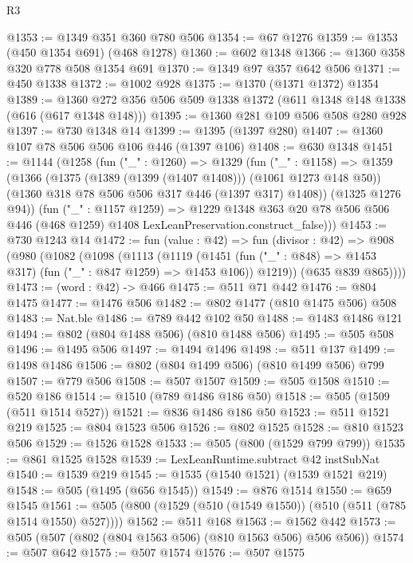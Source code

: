 \begin{lexlean}{R3}
\begin{coremodule}
@1353 := @1349 @351 @360 @780 @506
@1354 := @67 @1276
@1359 := @1353 (@450 @1354 @691) (@468 @1278)
@1360 := @602 @1348
@1366 := @1360 @358 @320 @778 @508 @1354 @691
@1370 := @1349 @97 @357 @642 @506
@1371 := @450 @1338
@1372 := @1002 @928
@1375 := @1370 (@1371 @1372) @1354
@1389 := @1360 @272 @356 @506 @509 @1338 @1372 (@611 @1348 @148 @1338 (@616 (@617 @1348 @148)))
@1395 := @1360 @281 @109 @506 @508 @280 @928
@1397 := @730 @1348 @14
@1399 := @1395 (@1397 @280)
@1407 := @1360 @107 @78 @506 @506 @106 @446 (@1397 @106)
@1408 := @630 @1348
@1451 := @1144
    (@1258
      (fun ("_" : @1260) =>
      @1329
        (fun ("_" : @1158) =>
        @1359
          (@1366
            (@1375 (@1389 (@1399 (@1407 @1408))) (@1061 @1273 @148 @50))
            (@1360 @318 @78 @506 @506 @317 @446 (@1397 @317) @1408))
          (@1325 @1276 @94))
        (fun ("_" : @1157 @1259) =>
        @1229
          @1348
          @363
          @20
          @78
          @506
          @506
          @446
          (@468 @1259)
          @1408
          LexLeanPreservation.construct_false)))
@1453 := @730 @1243 @14
@1472 := fun (value : @42) =>
  fun (divisor : @42) =>
  @908
    (@980
      (@1082
        (@1098
          (@1113
            (@1119
              (@1451 (fun ("_" : @848) => @1453 @317) (fun ("_" : @847 @1259) => @1453 @106))
              @1219))
          (@635 @839 @865))))
@1473 := (word : @42) -> @466
@1475 := @511 @71 @442
@1476 := @804 @1475
@1477 := @1476 @506
@1482 := @802 @1477 (@810 @1475 @506) @508
@1483 := Nat.ble
@1486 := @789 @442 @102 @50
@1488 := @1483 @1486 @121
@1494 := @802 (@804 @1488 @506) (@810 @1488 @506)
@1495 := @505 @508
@1496 := @1495 @506
@1497 := @1494 @1496
@1498 := @511 @137
@1499 := @1498 @1486
@1506 := @802 (@804 @1499 @506) (@810 @1499 @506) @799
@1507 := @779 @506
@1508 := @507 @1507
@1509 := @505 @1508
@1510 := @520 @186
@1514 := @1510 (@789 @1486 @186 @50)
@1518 := @505 (@1509 (@511 @1514 @527))
@1521 := @836 @1486 @186 @50
@1523 := @511 @1521 @219
@1525 := @804 @1523 @506
@1526 := @802 @1525
@1528 := @810 @1523 @506
@1529 := @1526 @1528
@1533 := @505 (@800 (@1529 @799 @799))
@1535 := @861 @1525 @1528
@1539 := LexLeanRuntime.subtract @42 instSubNat
@1540 := @1539 @219
@1545 := @1535 (@1540 @1521) (@1539 @1521 @219)
@1548 := @505 (@1495 (@656 @1545))
@1549 := @876 @1514
@1550 := @659 @1545
@1561 := @505 (@800 (@1529 (@510 (@1549 @1550)) (@510 (@511 (@785 @1514 @1550) @527))))
@1562 := @511 @168
@1563 := @1562 @442
@1573 := @505 (@507 (@802 (@804 @1563 @506) (@810 @1563 @506) @506 @506))
@1574 := @507 @642
@1575 := @507 @1574
@1576 := @507 @1575

\end{coremodule}
\end{lexlean}
